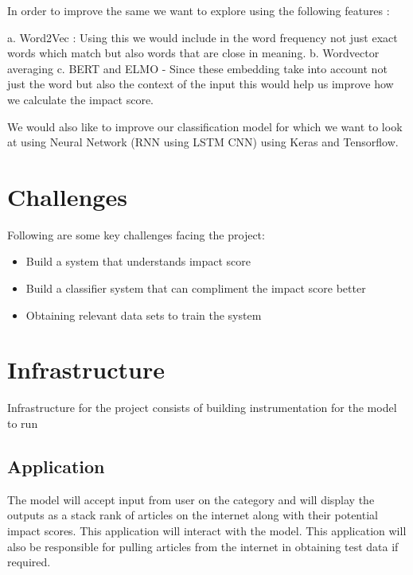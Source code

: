 \documentclass{article}
\begin{document}
In order to improve the same we want to explore using the following features : \newline

a. Word2Vec : Using this we would include in the word frequency not just exact words which match but also words that are close in meaning. \newline
b. Wordvector averaging \newline
c. BERT and ELMO - Since these embedding take into account not just the word but also the context of the input this would help us improve how we calculate the impact score. \newline

We would also like to improve our classification model for which we want to look at using Neural Network (RNN using LSTM CNN) using Keras and Tensorflow. \newline


\section*{Challenges} %

Following are some key challenges facing the project:
\begin{itemize}
	\item Build a system that understands impact score
	\item Build a classifier system that can compliment the impact score better
	\item Obtaining relevant data sets to train the system
\end{itemize}

 

\section*{Infrastructure} %
Infrastructure for the project consists of building instrumentation for the model to run

\subsection*{Application}
The model will accept input from user on the category and will display the outputs as a stack rank of articles on the internet along with their potential impact scores. This application will interact with the model. This application will also be responsible for pulling articles from the internet in obtaining test data if required.
\end{document}
